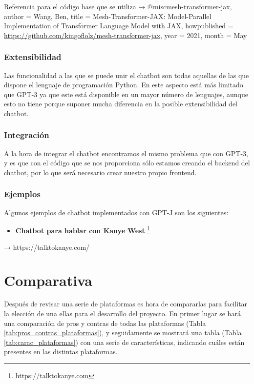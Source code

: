 Referencia para el código base que se utiliza → @misc{mesh-transformer-jax,
  author = {Wang, Ben},
  title = {{Mesh-Transformer-JAX: Model-Parallel Implementation of Transformer Language Model with JAX}},
  howpublished = {\url{https://github.com/kingoflolz/mesh-transformer-jax}},
  year = 2021,
  month = May
}


\subsubsection*{Extensibilidad}

Las funcionalidad a las que se puede unir el chatbot son todas aquellas de las que dispone el lenguaje de programación Python. En este aspecto está más limitado que GPT-3 ya que este está disponible en un mayor número de lenguajes, aunque esto no tiene porque suponer mucha diferencia en la posible extensibilidad del chatbot.

\subsubsection*{Integración}

A la hora de integrar el chatbot encontramos el mismo problema que con GPT-3, y es que con el código que se nos proporciona sólo estamos creando el backend del chatbot, por lo que será necesario crear nuestro propio frontend.

\subsubsection*{Ejemplos}

Algunos ejemplos de chatbot implementados con GPT-J son los siguientes:

\begin{itemize}
    \item \textbf{Chatbot para hablar con Kanye West} \footnote{https://talktokanye.com}
\end{itemize}



→ https://talktokanye.com/





\section{Comparativa}


Después de revisar una serie de plataformas es hora de compararlas para facilitar la elección de una ellas para el desarrollo del proyecto. En primer lugar se hará una comparación de pros y contras de todas las plataformas (Tabla \ref{tab:pros_contras_plataformas}), y seguidamente se mostrará una tabla (Tabla \ref{tab:carac_plataformas}) con una serie de características, indicando cuáles están presentes en las distintas plataformas.


